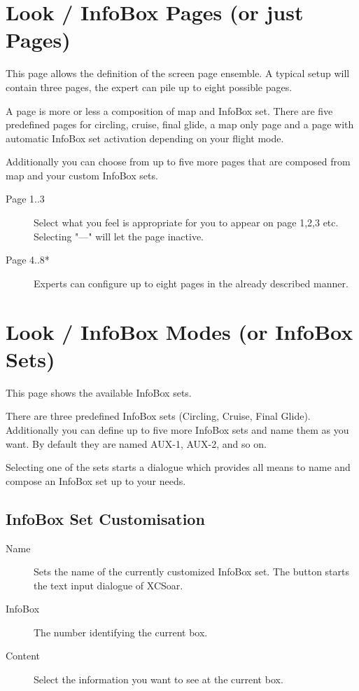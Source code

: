 \section{Look / InfoBox Pages (or just Pages)}

This page allows the definition of the screen page ensemble. A typical setup 
will contain three pages, the expert can pile up to eight possible pages.

A page is more or less a composition of map and InfoBox set. There are five 
predefined pages for circling, cruise, final glide, a map only page and a 
page with automatic InfoBox set activation depending on your flight mode.

Additionally you can choose from up to five more pages that are composed from map 
and your custom InfoBox sets.  

\begin{description}
\item[Page 1..3]  Select what you feel is appropriate for you to appear on page 1,2,3 etc. 
  Selecting "---" will let the page inactive.
\item[Page 4..8*]  Experts can configure up to eight pages in the already 
  described manner.
\end{description}


\section{Look / InfoBox Modes (or InfoBox Sets)}\label{sec:infobox_sets}

This page shows the available InfoBox sets.

There are three predefined InfoBox sets (Circling, Cruise, Final Glide). Additionally you 
can define up to five more InfoBox sets and name them as you want.   By default they 
are named AUX-1, AUX-2, and so on.

Selecting one of the sets starts a dialogue which provides all means to name and 
compose an InfoBox set up to your needs.

\subsection*{InfoBox Set Customisation}

\begin{description}
\item[Name]  Sets the name of the currently customized InfoBox set. The 
  button starts the text input dialogue of XCSoar.
\item[InfoBox]  The number identifying the current box.
\item[Content]  Select the information you want to see at the current box.
\end{description}

